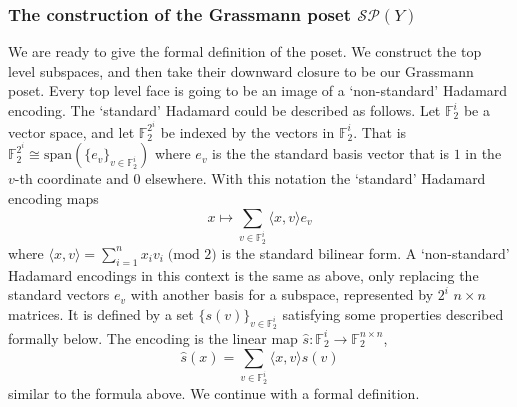 \documentclass[10pt,a4paper]{article}
\theoremstyle{definition}
\theoremstyle{remark}
\newcommand{\set}[1]{\{#1\}}
\newcommand{\iprod}[1]{\langle#1\rangle}
\def\sp{\mathrm{ span}}
\newcommand{\F}{\mathbb{F}}
\numberwithin{equation}{section}
\def\Y{Y}
\def\M{\mathcal{SP}}
\begin{document}
\subsubsection[The construction of the Grassmann posets]{The construction of the Grassmann poset \(\M(\Y)\)}
We are ready to give the formal definition of the poset. We construct the top level subspaces, and then take their downward closure to be our Grassmann poset. Every top level face is going to be an image of a `non-standard' Hadamard encoding. The `standard' Hadamard could be described as follows. Let \(\F_2^i\) be a vector space, and let \(\F_2^{2^i}\) be indexed by the vectors in \(\F_2^i\). That is \(\F_2^{2^i} \cong \sp(\set{e_v}_{v \in \F_2^i})\) where \(e_v\) is the the standard basis vector that is \(1\) in the \(v\)-th coordinate and \(0\) elsewhere. With this notation the `standard' Hadamard encoding maps 
\[x \mapsto \sum_{v \in \F_2^i}\iprod{x,v} e_v\]
where \(\iprod{x,v} = \sum_{i=1}^n x_i v_i \; \text{(mod 2)}\) is the standard bilinear form. A `non-standard' Hadamard encodings in this context is the same as above, only replacing the standard vectors \(e_v\) with another basis for a subspace, represented by \(2^{i}\) \(n \times n\) matrices. It is defined by a set \(\set{s(v)}_{v \in \F_2^i}\) satisfying some properties described formally below. The encoding is the linear map \(\widehat{s}:\F_2^i \to \F_2^{n \times n}\),
\[\widehat{s}(x) = \sum_{v \in \F_2^i}\iprod{x,v}s(v)\]
similar to the formula above.
%
We continue with a formal definition.
\end{document}
